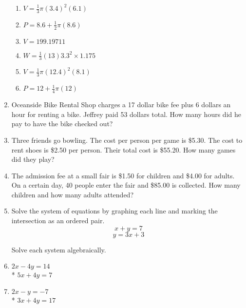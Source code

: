 \documentclass[12pt, twoside]{article}
\begin{document}
\begin{enumerate}
\begin{multicols}{2}
\begin{enumerate}[itemsep=2cm]
      \item $V=\frac{1}{3} \pi (3.4)^2(6.1)$
      \item $P=8.6 + \frac{1}{2} \pi (8.6)$  
      \item $V=199.19711$
      \item $W=\frac{1}{3} (13)  3.3^2 \times 1.175$
      \item $V=\frac{1}{3} \pi (12.4)^2(8.1)$
      \item $P=12 + \frac{1}{4} \pi (12)$ 
    \end{enumerate}
    \end{multicols}\vspace{2cm}
  
     
  
  \newpage
    \item Oceanside Bike Rental Shop charges a 17 dollar bike fee plus 6 dollars an hour for renting a bike. Jeffrey paid 53 dollars total. How many hours did he pay to have the bike checked out? \vspace{6cm}
  
    \item Three friends go bowling. The cost per person per game is \$5.30. The cost to rent shoes is \$2.50 per person. Their total cost is \$55.20. How many games did they play? \vspace{6cm}
  
    \item The admission fee at a small fair is \$1.50 for children and \$4.00 for adults. On a certain day, 40 people enter the fair and \$85.00 is collected. How many children and how many adults attended?
  
\newpage
\item Solve the system of equations by graphing each line and marking the intersection as an ordered pair.
      \[x+y=7\]
      \[y=3x+3\]
  
  \begin{center} %
  \end{center}
  
  \newpage
    Solve each system algebraically.
    \item
    $2x-4y=14$\\*
    $5x+4y=7$ \vspace{6cm}
  
    \item
    $2x-y=-7$\\*
    $3x+4y=17$  \vspace{6cm}
      
      

\end{enumerate}
\end{document}
